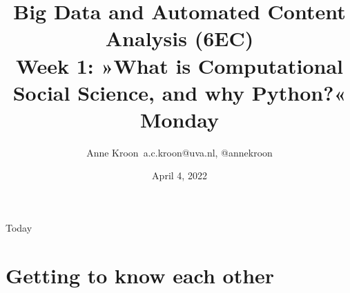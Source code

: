 

\graphicspath{{../../resources/img/}}




\title[Big Data and Automated Content Analysis]{\textbf{Big Data and Automated Content Analysis (6EC)} 
\\Week 1: »What is Computational Social Science, and why Python?«
\\Monday }
\author[Anne Kroon]{Anne Kroon\ \footnotesize{a.c.kroon@uva.nl, @annekroon \\}}
\date{April 4, 2022}

\begin{frame}{}
	\titlepage
\end{frame}

\begin{frame}{Today}
	\tableofcontents
\end{frame}


\section{Getting to know each other}


